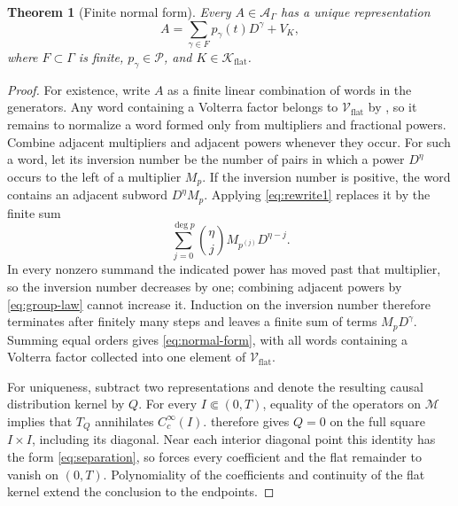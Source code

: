 \documentclass[11pt]{article}
\numberwithin{equation}{section}
\newtheorem{theorem}{Theorem}
\theoremstyle{definition}
\theoremstyle{remark}
\newcommand{\M}{\mathcal M}
\newcommand{\A}{\mathcal A}
\newcommand{\Pcal}{\mathcal P}
\newcommand{\Vflat}{\mathcal V_{\mathrm{flat}}}
\newcommand{\Kflat}{\mathcal K_{\mathrm{flat}}}
\begin{document}
\begin{theorem}[Finite normal form]\label{thm:normal-form}
Every $A\in\A_\Gamma$ has a unique representation
\begin{equation}
A=\sum_{\gamma\in F}p_\gamma(t)D^\gamma+V_K,
\label{eq:normal-form}
\end{equation}
where $F\subset\Gamma$ is finite, $p_\gamma\in\Pcal$, and $K\in\Kflat$.
\end{theorem}

\begin{proof}
For existence, write $A$ as a finite linear combination of words in the generators. Any word containing a Volterra factor belongs to $\Vflat$ by , so it remains to normalize a word formed only from multipliers and fractional powers. Combine adjacent multipliers and adjacent powers whenever they occur. For such a word, let its inversion number be the number of pairs in which a power $D^\eta$ occurs to the left of a multiplier $M_p$. If the inversion number is positive, the word contains an adjacent subword $D^\eta M_p$. Applying \eqref{eq:rewrite1} replaces it by the finite sum
\begin{equation*}
\sum_{j=0}^{\deg p}\binom{\eta}{j}M_{p^{(j)}}D^{\eta-j}.
\end{equation*}
In every nonzero summand the indicated power has moved past that multiplier, so the inversion number decreases by one; combining adjacent powers by \eqref{eq:group-law} cannot increase it. Induction on the inversion number therefore terminates after finitely many steps and leaves a finite sum of terms $M_pD^\gamma$. Summing equal orders gives \eqref{eq:normal-form}, with all words containing a Volterra factor collected into one element of $\Vflat$.

For uniqueness, subtract two representations and denote the resulting causal distribution kernel by $Q$. For every $I\Subset(0,T)$, equality of the operators on $\M$ implies that $T_Q$ annihilates $C_c^\infty(I)$.  therefore gives $Q=0$ on the full square $I\times I$, including its diagonal. Near each interior diagonal point this identity has the form \eqref{eq:separation}, so  forces every coefficient and the flat remainder to vanish on $(0,T)$. Polynomiality of the coefficients and continuity of the flat kernel extend the conclusion to the endpoints.
\end{proof}
\end{document}
